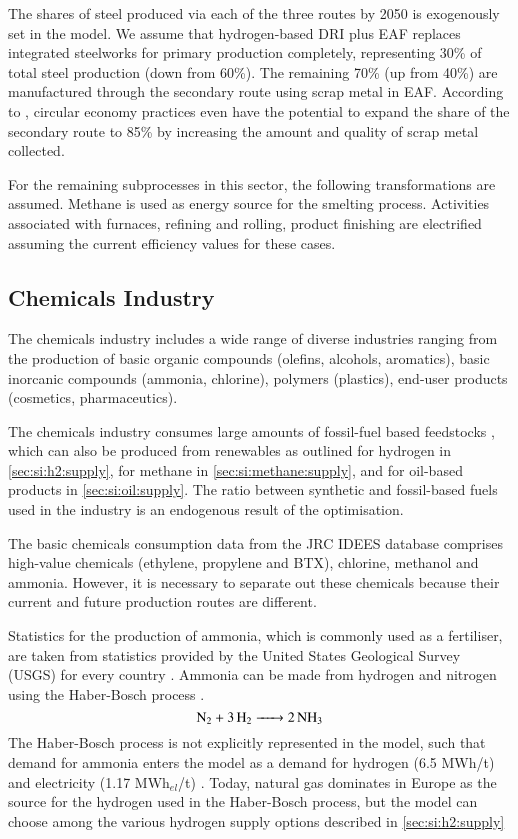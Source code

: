 The shares of steel produced via each of the three routes by 2050 is exogenously
set in the model. We assume that hydrogen-based DRI plus EAF replaces integrated
steelworks for primary production completely, representing 30\% of total steel
production (down from 60\%). The remaining 70\% (up from 40\%) are manufactured
through the secondary route using scrap metal in EAF. According to
, circular economy practices even have the potential to
expand the share of the secondary route to 85\% by increasing the amount and
quality of scrap metal collected.

For the remaining subprocesses in this sector, the following transformations are
assumed. Methane is used as energy source for the smelting process. Activities
associated with furnaces, refining and rolling, product finishing are
electrified assuming the current efficiency values for these cases.

\subsection{Chemicals Industry}
\label{sec:si:industry:chemicals}

The chemicals industry includes a wide range of diverse industries ranging from
the production of basic organic compounds (olefins, alcohols, aromatics), basic
inorcanic compounds (ammonia, chlorine), polymers (plastics), end-user products
(cosmetics, pharmaceutics).

The chemicals industry consumes large amounts of fossil-fuel based feedstocks
, which can also be produced from renewables as
outlined for hydrogen in \cref{sec:si:h2:supply}, for methane in
\cref{sec:si:methane:supply}, and for oil-based products in
\cref{sec:si:oil:supply}. The ratio between synthetic and fossil-based fuels
used in the industry is an endogenous result of the optimisation.

The basic chemicals consumption data from the JRC IDEES \cite{IDEES} database
comprises high-value chemicals (ethylene, propylene and BTX), chlorine, methanol
and ammonia. However, it is necessary to separate out these chemicals because
their current and future production routes are different.

Statistics for the production of ammonia, which is commonly used as a
fertiliser, are taken from statistics provided by the United States Geological
Survey (USGS) for every country \citeS{}. Ammonia can be made from hydrogen and
nitrogen using the Haber-Bosch process .
\begin{equation}
    \ce{N2 + 3H2 -> 2NH3}
\end{equation}
The Haber-Bosch process is not explicitly represented in the model, such that
demand for ammonia enters the model as a demand for hydrogen (6.5
MWh/t) and electricity (1.17 MWh$_{el}$/t)
. Today, natural gas dominates in Europe as the source for
the hydrogen used in the Haber-Bosch process, but the model can choose among the
various hydrogen supply options described in
\cref{sec:si:h2:supply}

